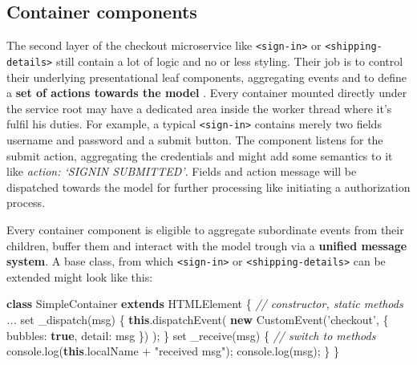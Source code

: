 \documentclass[]{article}
\newenvironment{Shaded}{}{}
\newcommand{\KeywordTok}[1]{\textcolor[rgb]{0.00,0.44,0.13}{\textbf{{#1}}}}
\newcommand{\DataTypeTok}[1]{\textcolor[rgb]{0.56,0.13,0.00}{{#1}}}
\newcommand{\StringTok}[1]{\textcolor[rgb]{0.25,0.44,0.63}{{#1}}}
\newcommand{\CommentTok}[1]{\textcolor[rgb]{0.38,0.63,0.69}{\textit{{#1}}}}
\newcommand{\VariableTok}[1]{\textcolor[rgb]{0.10,0.09,0.49}{{#1}}}
\newcommand{\OperatorTok}[1]{\textcolor[rgb]{0.40,0.40,0.40}{{#1}}}
\newcommand{\AttributeTok}[1]{\textcolor[rgb]{0.49,0.56,0.16}{{#1}}}
\newcommand{\NormalTok}[1]{{#1}}
\begin{document}
\subsection{Container components}\label{container-components}

The second layer of the checkout microservice like
\texttt{\textless{}sign-in\textgreater{}} or
\texttt{\textless{}shipping-details\textgreater{}} still contain a lot
of logic and no or less styling. Their job is to control their
underlying presentational leaf components, aggregating events and to
define a \textbf{set of actions towards the model} . Every container
mounted directly under the service root may have a dedicated area inside
the worker thread where it's fulfil his duties. For example, a typical
\texttt{\textless{}sign-in\textgreater{}} contains merely two fields
username and password and a submit button. The component listens for the
submit action, aggregating the credentials and might add some semantics
to it like \emph{action: `SIGNIN SUBMITTED'}. Fields and action message
will be dispatched towards the model for further processing like
initiating a authorization process.

Every container component is eligible to aggregate subordinate events
from their children, buffer them and interact with the model trough via
a \textbf{unified message system}. A base class, from which
\texttt{\textless{}sign-in\textgreater{}} or
\texttt{\textless{}shipping-details\textgreater{}} can be extended might
look like this:

\begin{Shaded}
\begin{Highlighting}[]
\KeywordTok{class} \NormalTok{SimpleContainer }\KeywordTok{extends} \NormalTok{HTMLElement }\OperatorTok{\{}
  \CommentTok{// constructor, static methods ...}
  \NormalTok{set }\AttributeTok{_dispatch}\NormalTok{(msg) }\OperatorTok{\{}
    \KeywordTok{this}\NormalTok{.}\AttributeTok{dispatchEvent}\NormalTok{(}
      \KeywordTok{new} \AttributeTok{CustomEvent}\NormalTok{(}\StringTok{'checkout'}\OperatorTok{,} \OperatorTok{\{}
      \DataTypeTok{bubbles}\OperatorTok{:} \KeywordTok{true}\OperatorTok{,}
      \DataTypeTok{detail}\OperatorTok{:} \NormalTok{msg}
      \OperatorTok{\}}\NormalTok{)}
    \NormalTok{)}\OperatorTok{;}
  \OperatorTok{\}}
  \NormalTok{set }\AttributeTok{_receive}\NormalTok{(msg) }\OperatorTok{\{}
  \CommentTok{// switch to methods}
    \VariableTok{console}\NormalTok{.}\AttributeTok{log}\NormalTok{(}\KeywordTok{this}\NormalTok{.}\AttributeTok{localName} \OperatorTok{+} \StringTok{"received msg"}\NormalTok{)}\OperatorTok{;}
    \VariableTok{console}\NormalTok{.}\AttributeTok{log}\NormalTok{(msg)}\OperatorTok{;}
  \OperatorTok{\}}
\OperatorTok{\}}
\end{Highlighting}
\end{Shaded}
\end{document}
